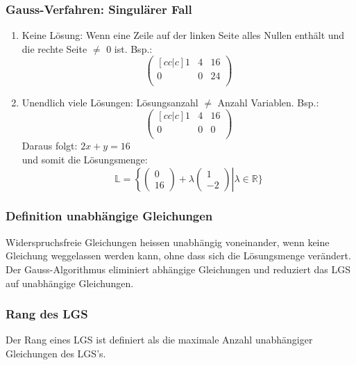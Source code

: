\documentclass[10pt]{scrartcl}
\begin{document}
\begin{multicols}{2}
\subsubsection*{Gauss-Verfahren: Singulärer Fall}
\begin{enumerate}
\item Keine Lösung: Wenn eine Zeile auf der linken Seite alles Nullen enthält und die rechte Seite $\neq$ 0 ist. Bsp.: \begin{equation}
\begin{pmatrix}[cc|c]
1 & 4 & 16 \\
0 & 0 & 24 \\
\end{pmatrix}
\end{equation}
\item Unendlich viele Lösungen: Lösungsanzahl $\neq$ Anzahl Variablen. Bsp.: \begin{equation}
\begin{pmatrix}[cc|c]
1 & 4 & 16 \\
0 & 0 & 0 \\
\end{pmatrix}
\end{equation}
Daraus folgt: $2x+y=16$ \\ und somit die Lösungsmenge: \begin{equation}\mathbb{L}=\left\lbrace \left( \begin{matrix} 0 \\ 16 \end{matrix}\right) + \lambda \left(\begin{matrix} 1 \\ -2 \end{matrix}\right)  \right | \lambda \in \mathbb{R} \rbrace  \end{equation}
\end{enumerate} 
\subsubsection*{Definition unabhängige Gleichungen} 
Widerspruchsfreie Gleichungen heissen unabhängig voneinander, wenn keine Gleichung weggelassen werden kann, ohne dass sich die Lösungsmenge verändert. \\ Der Gauss-Algorithmus eliminiert abhängige Gleichungen und reduziert das LGS auf unabhängige Gleichungen.
\subsubsection*{Rang des LGS}
Der Rang eines LGS ist definiert als die maximale Anzahl unabhängiger Gleichungen des LGS's.

\end{multicols}
\end{document}
